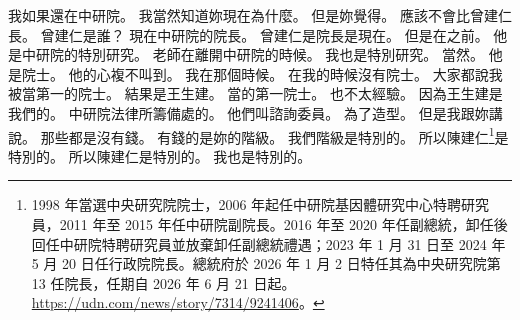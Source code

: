 \hypertarget{c01:cue:3449}{}我如果還在中研院。
\hypertarget{c01:cue:3450}{}我當然知道妳現在為什麼。
\hypertarget{c01:cue:3451}{}但是妳覺得。
\hypertarget{c01:cue:3452}{}應該不會比曾建仁長。
\hypertarget{c01:cue:3453}{}曾建仁是誰？
\hypertarget{c01:cue:3454}{}現在中研院的院長。
\hypertarget{c01:cue:3455}{}曾建仁是院長是現在。
\hypertarget{c01:cue:3456}{}但是在之前。
\hypertarget{c01:cue:3457}{}他是中研院的特別研究。
\hypertarget{c01:cue:3458}{}老師在離開中研院的時候。
\hypertarget{c01:cue:3459}{}我也是特別研究。
\hypertarget{c01:cue:3460}{}當然。
\hypertarget{c01:cue:3461}{}他是院士。
\hypertarget{c01:cue:3462}{}他的心複不叫到。
\hypertarget{c01:cue:3463}{}我在那個時候。
\hypertarget{c01:cue:3464}{}在我的時候沒有院士。
\hypertarget{c01:cue:3465}{}大家都說我被當第一的院士。
\hypertarget{c01:cue:3466}{}結果是王生建。
\hypertarget{c01:cue:3467}{}當的第一院士。
\hypertarget{c01:cue:3468}{}也不太經驗。
\hypertarget{c01:cue:3469}{}因為王生建是我們的。
\hypertarget{c01:cue:3470}{}中研院法律所籌備處的。
\hypertarget{c01:cue:3471}{}他們叫諮詢委員。
\hypertarget{c01:cue:3472}{}為了造型。
\hypertarget{c01:cue:3473}{}但是我跟妳講說。
\hypertarget{c01:cue:3474}{}那些都是沒有錢。
\hypertarget{c01:cue:3475}{}有錢的是妳的階級。
\hypertarget{c01:cue:3476}{}我們階級是特別的。
\hypertarget{c01:cue:3477}{}所以陳建仁\footnote{1998 年當選中央研究院院士，2006 年起任中研院基因體研究中心特聘研究員，2011 年至 2015 年任中研院副院長。2016 年至 2020 年任副總統，卸任後回任中研院特聘研究員並放棄卸任副總統禮遇；2023 年 1 月 31 日至 2024 年 5 月 20 日任行政院院長。總統府於 2026 年 1 月 2 日特任其為中央研究院第 13 任院長，任期自 2026 年 6 月 21 日起。\url{https://udn.com/news/story/7314/9241406}。}是特別的。
\hypertarget{c01:cue:3478}{}所以陳建仁是特別的。
\hypertarget{c01:cue:3479}{}我也是特別的。


